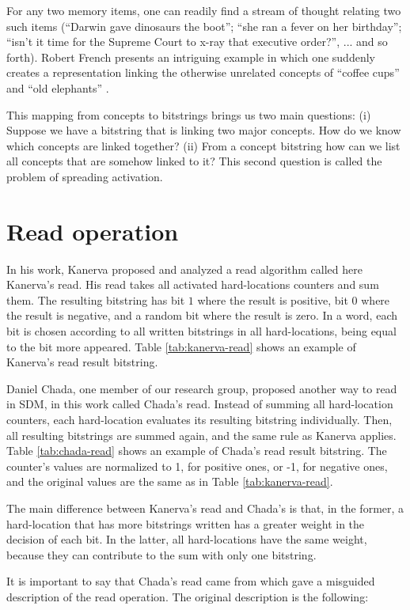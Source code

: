 For any two memory items, one can readily find a stream of thought relating two such items (``Darwin gave dinosaurs the boot''; ``she ran a fever on her birthday''; ``isn't it time for the Supreme Court to x-ray that executive order?'', ... and so forth). Robert French presents an intriguing example in which one suddenly creates a representation linking the otherwise unrelated concepts of ``coffee cups'' and ``old elephants'' \citep{French1997}.

This mapping from concepts to bitstrings brings us two main questions: (i) Suppose we have a bitstring that is linking two major concepts.  How do we know which concepts are linked together? (ii) From a concept bitstring how can we list all concepts that are somehow linked to it? This second question is called the problem of spreading activation.


\section{Read operation}

In his work, Kanerva proposed and analyzed a read algorithm called here Kanerva's read. His read takes all activated hard-locations counters and sum them. The resulting bitstring has bit $1$ where the result is positive, bit $0$ where the result is negative, and a random bit where the result is zero. In a word, each bit is chosen according to all written bitstrings in all hard-locations, being equal to the bit more appeared. Table \ref{tab:kanerva-read} shows an example of Kanerva's read result bitstring.

Daniel Chada, one member of our research group, proposed another way to read in SDM, in this work called Chada's read. Instead of summing all hard-location counters, each hard-location evaluates its resulting bitstring individually. Then, all resulting bitstrings are summed again, and the same rule as Kanerva applies. Table \ref{tab:chada-read} shows an example of Chada's read result bitstring. The counter's values are normalized to 1, for positive ones, or -1, for negative ones, and the original values are the same as in Table \ref{tab:kanerva-read}.

The main difference between Kanerva's read and Chada's is that, in the former, a hard-location that has more bitstrings written has a greater weight in the decision of each bit. In the latter, all hard-locations have the same weight, because they can contribute to the sum with only one bitstring.

It is important to say that Chada's read came from \citet{anwar2003sparse} which gave a misguided description of the read operation. The original description is the following:

